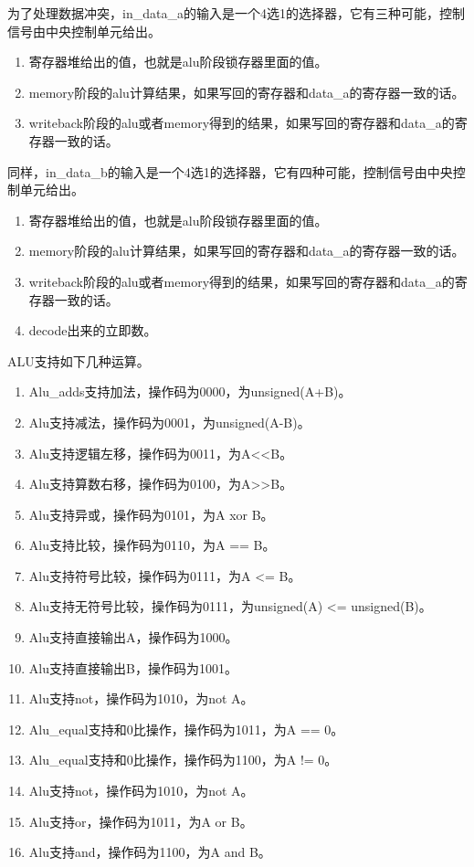     为了处理数据冲突，in\_data\_a的输入是一个4选1的选择器，它有三种可能，控制信号由中央控制单元给出。
    \begin{enumerate}
        \item 寄存器堆给出的值，也就是alu阶段锁存器里面的值。
        \item memory阶段的alu计算结果，如果写回的寄存器和data\_a的寄存器一致的话。
        \item writeback阶段的alu或者memory得到的结果，如果写回的寄存器和data\_a的寄存器一致的话。
    \end{enumerate}


    同样，in\_data\_b的输入是一个4选1的选择器，它有四种可能，控制信号由中央控制单元给出。
    \begin{enumerate}
        \item 寄存器堆给出的值，也就是alu阶段锁存器里面的值。
        \item memory阶段的alu计算结果，如果写回的寄存器和data\_a的寄存器一致的话。
        \item writeback阶段的alu或者memory得到的结果，如果写回的寄存器和data\_a的寄存器一致的话。
        \item decode出来的立即数。
    \end{enumerate}

    ALU支持如下几种运算。
    \begin{enumerate}
        \item Alu\_adds支持加法，操作码为0000，为unsigned(A+B)。
        \item Alu支持减法，操作码为0001，为unsigned(A-B)。
        \item Alu支持逻辑左移，操作码为0011，为A<<B。
        \item Alu支持算数右移，操作码为0100，为A>>B。
        \item Alu支持异或，操作码为0101，为A  xor  B。
        \item Alu支持比较，操作码为0110，为A  ==  B。
        \item Alu支持符号比较，操作码为0111，为A  <=  B。
        \item Alu支持无符号比较，操作码为0111，为unsigned(A)  <=  unsigned(B)。
        \item Alu支持直接输出A，操作码为1000。
        \item Alu支持直接输出B，操作码为1001。
        \item Alu支持not，操作码为1010，为not  A。
        \item Alu\_equal支持和0比操作，操作码为1011，为A == 0。
        \item Alu\_equal支持和0比操作，操作码为1100，为A != 0。
        \item Alu支持not，操作码为1010，为not  A。
        \item Alu支持or，操作码为1011，为A  or  B。
        \item Alu支持and，操作码为1100，为A  and  B。
    \end{enumerate}

